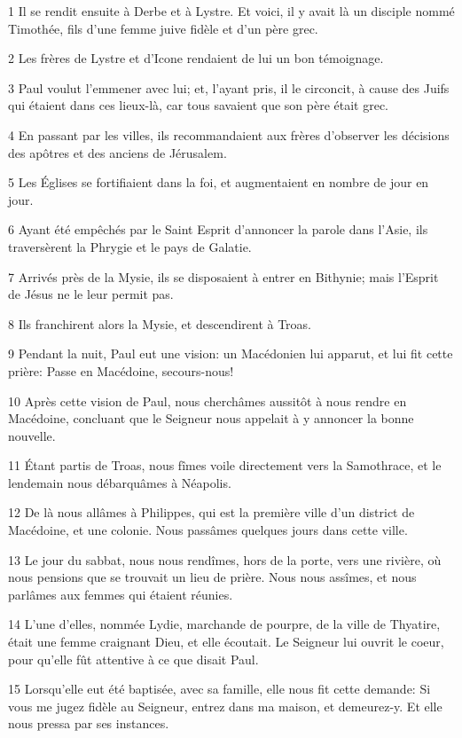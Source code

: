 \par 1 Il se rendit ensuite à Derbe et à Lystre. Et voici, il y avait là un disciple nommé Timothée, fils d'une femme juive fidèle et d'un père grec.
\par 2 Les frères de Lystre et d'Icone rendaient de lui un bon témoignage.
\par 3 Paul voulut l'emmener avec lui; et, l'ayant pris, il le circoncit, à cause des Juifs qui étaient dans ces lieux-là, car tous savaient que son père était grec.
\par 4 En passant par les villes, ils recommandaient aux frères d'observer les décisions des apôtres et des anciens de Jérusalem.
\par 5 Les Églises se fortifiaient dans la foi, et augmentaient en nombre de jour en jour.
\par 6 Ayant été empêchés par le Saint Esprit d'annoncer la parole dans l'Asie, ils traversèrent la Phrygie et le pays de Galatie.
\par 7 Arrivés près de la Mysie, ils se disposaient à entrer en Bithynie; mais l'Esprit de Jésus ne le leur permit pas.
\par 8 Ils franchirent alors la Mysie, et descendirent à Troas.
\par 9 Pendant la nuit, Paul eut une vision: un Macédonien lui apparut, et lui fit cette prière: Passe en Macédoine, secours-nous!
\par 10 Après cette vision de Paul, nous cherchâmes aussitôt à nous rendre en Macédoine, concluant que le Seigneur nous appelait à y annoncer la bonne nouvelle.
\par 11 Étant partis de Troas, nous fîmes voile directement vers la Samothrace, et le lendemain nous débarquâmes à Néapolis.
\par 12 De là nous allâmes à Philippes, qui est la première ville d'un district de Macédoine, et une colonie. Nous passâmes quelques jours dans cette ville.
\par 13 Le jour du sabbat, nous nous rendîmes, hors de la porte, vers une rivière, où nous pensions que se trouvait un lieu de prière. Nous nous assîmes, et nous parlâmes aux femmes qui étaient réunies.
\par 14 L'une d'elles, nommée Lydie, marchande de pourpre, de la ville de Thyatire, était une femme craignant Dieu, et elle écoutait. Le Seigneur lui ouvrit le coeur, pour qu'elle fût attentive à ce que disait Paul.
\par 15 Lorsqu'elle eut été baptisée, avec sa famille, elle nous fit cette demande: Si vous me jugez fidèle au Seigneur, entrez dans ma maison, et demeurez-y. Et elle nous pressa par ses instances.
